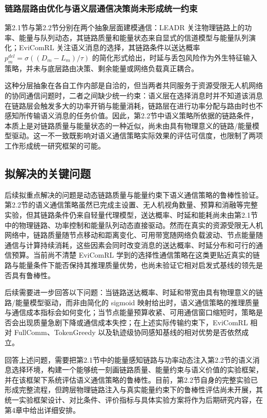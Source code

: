 \subsubsection{链路层路由优化与语义层通信决策尚未形成统一约束}

第2.1节与第2.2节分别在两个抽象层面建模通信：LEADR 关注物理链路上的功率、能量与队列动态，其链路质量和能量状态来自显式的信道模型与能量队列演化；EviComRL 关注语义消息的选择，其链路条件以送达概率 $p_m^{del}=\sigma\!\left((D_m-L_m)/\tau\right)$ 的简化形式给出，时延与丢包风险作为外生特征输入策略，并未与底层路由决策、剩余能量或网络负载真正耦合。

这种分层抽象在各自工作内部是自洽的，但当两者共同服务于资源受限无人机网络的协同通信问题时，二者之间缺少统一约束：语义层在选择消息时并不知道该消息在链路层会触发多大的功率开销与能量消耗，链路层在进行功率分配与路由时也不感知所传输语义消息的任务价值。因此，第2.2节中语义策略所依据的链路条件，本质上是对链路质量与能量状态的一种近似，尚未由具有物理意义的链路/能量模型驱动。这一不一致既影响对语义通信策略实际效果的评估可信度，也限制了两项工作形成统一研究框架的可能。

\subsection{拟解决的关键问题}
后续拟重点解决的问题是动态链路质量与能量约束下语义通信策略的鲁棒性验证。
第2.2节的语义通信策略虽然已完成主设置、无人机视角数量、预算和消融等完整实验，但其链路条件仍来自轻量代理模型，送达概率、时延和能耗尚未由第2.1节中的物理链路、功率控制和能量队列动态直接驱动。然而在真实的资源受限无人机网络中，链路质量随节点移动和距离变化、可用带宽随网络负载波动、节点能量随通信与计算持续消耗，这些因素会同时改变消息的送达概率、时延分布和可行的通信预算。当前尚不清楚 EviComRL 学到的选择性通信策略在这类更贴近真实的链路与能量条件下能否保持其推理质量优势，也尚未验证它相对启发式基线的领先是否具有鲁棒性。

后续需要进一步回答以下问题：当链路送达概率、时延和带宽由具有物理意义的链路/能量模型驱动，而非由简化的 sigmoid 映射给出时，语义通信策略的推理质量与通信成本指标会如何变化；当节点能量预算收紧、可用通信窗口缩短时，策略是否会出现质量急剧下降或通信成本失控；在上述实际传输约束下，EviComRL 相对 FullComm、TokenGreedy 以及轨迹级协同感知基线的相对优势是否依然成立。

回答上述问题，需要把第2.1节中的能量感知链路与功率动态注入第2.2节的语义消息选择环境，构建一个能够统一刻画链路质量、能量约束与语义价值的实验框架，并在该框架下系统评估语义通信策略的鲁棒性。目前，第2.2节自身的完整实验已形成完整流程，但跨层物理链路注入与真实能量约束下的鲁棒性评估尚未开展，其统一实验框架设计、对比条件、评价指标与具体实验方案将作为后期研究内容，在第4章中给出详细安排。

